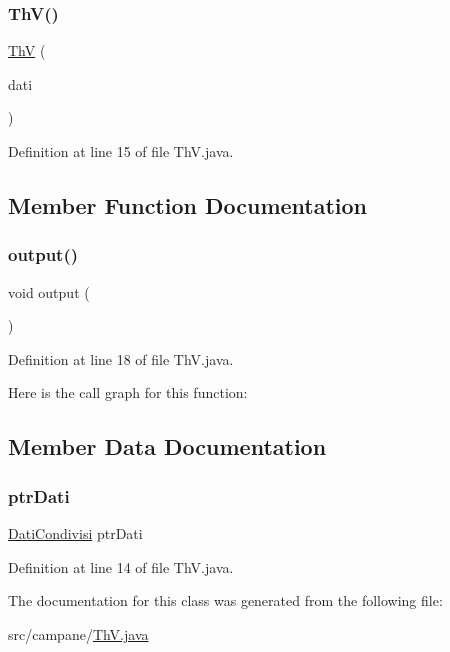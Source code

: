 \subsubsection{\texorpdfstring{Th\+V()}{ThV()}}
{\footnotesize\ttfamily \hyperlink{classcampane_1_1_th_v}{ThV} (\begin{DoxyParamCaption}\item[{\hyperlink{classcampane_1_1_dati_condivisi}{Dati\+Condivisi}}]{dati }\end{DoxyParamCaption})}



Definition at line 15 of file Th\+V.\+java.



\subsection{Member Function Documentation}
\mbox{\label{classcampane_1_1_th_v_a7437b254e19e7e12fc2ec99945f4ecea}} 
\subsubsection{\texorpdfstring{output()}{output()}}
{\footnotesize\ttfamily void output (\begin{DoxyParamCaption}{ }\end{DoxyParamCaption})}



Definition at line 18 of file Th\+V.\+java.

Here is the call graph for this function\+:


\subsection{Member Data Documentation}
\mbox{\label{classcampane_1_1_th_v_af3ade885f29d5a10bb194e8e3e1480c5}} 
\subsubsection{\texorpdfstring{ptr\+Dati}{ptrDati}}
{\footnotesize\ttfamily \hyperlink{classcampane_1_1_dati_condivisi}{Dati\+Condivisi} ptr\+Dati\hspace{0.3cm}{\ttfamily [private]}}



Definition at line 14 of file Th\+V.\+java.



The documentation for this class was generated from the following file\+:\begin{DoxyCompactItemize}
\item 
src/campane/\hyperlink{_th_v_8java}{Th\+V.\+java}\end{DoxyCompactItemize}
